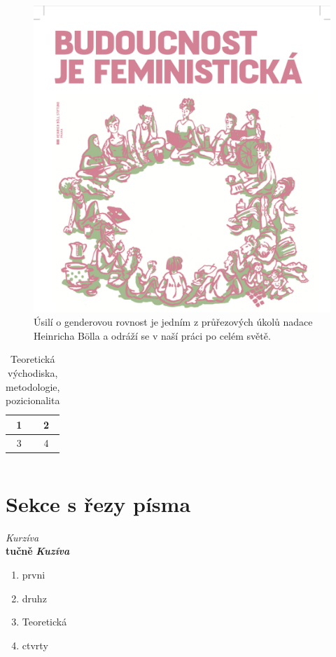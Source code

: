 \documentclass[12pt, a4paper]{article}
\begin{document}
\begin{figure}
    \centering
    \includegraphics[width=.8\textwidth, angle=90]{img.png}
    \caption{Úsilí o genderovou rovnost je jedním z průřezových úkolů nadace
    Heinricha Bölla a odráží se v naší práci po celém světě.}
    \label{fig:feminismus}
\end{figure}

\begin{table}
\centering
\caption{Teoretická východiska, metodologie, pozicionalita}
\begin{tabular}{c|c}
    1 & 2 \\ \hline
    3 & 4
\end{tabular}
\label{tab:metodologie}
\end{table}

\begin{equation}
    \label{equ:rovnice}
\end{equation}

\section{Sekce s řezy písma}
\textit{Kurzíva}\\[2cm]
\textbf{tučně}
{\itshape\bfseries Kuzíva}

\begin{enumerate}
    \item prvni
    \item druhz
    \item Teoretická
    \item ctvrty
\end{enumerate}

\listoffigures
\end{document}
